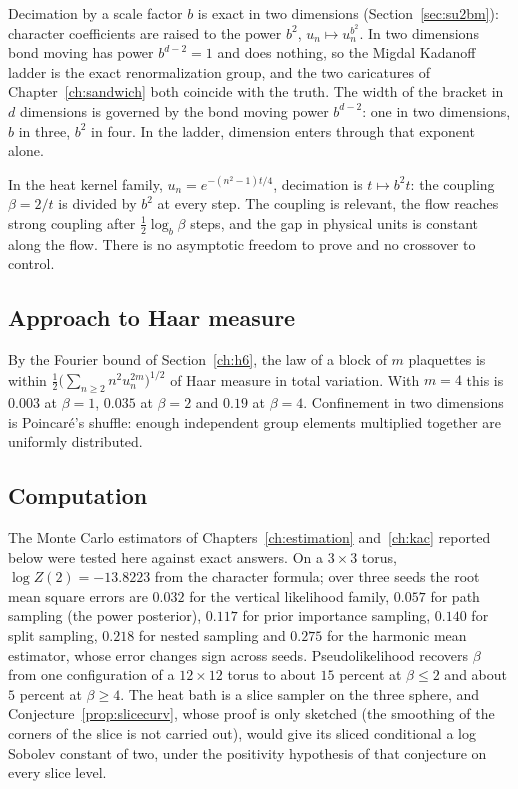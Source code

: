 Decimation by a scale factor $b$ is exact in two dimensions (Section~\ref{sec:su2bm}): character coefficients are raised to the power $b^2$, $u_n\mapsto u_n^{b^2}$. In two dimensions bond moving has power $b^{d-2}=1$ and does nothing, so the Migdal Kadanoff ladder is the exact renormalization group, and the two caricatures of Chapter~\ref{ch:sandwich} both coincide with the truth. The width of the bracket in $d$ dimensions is governed by the bond moving power $b^{d-2}$: one in two dimensions, $b$ in three, $b^2$ in four. In the ladder, dimension enters through that exponent alone.

In the heat kernel family, $u_n=e^{-(n^2-1)t/4}$, decimation is $t\mapsto b^2t$: the coupling $\beta=2/t$ is divided by $b^2$ at every step. The coupling is relevant, the flow reaches strong coupling after $\frac12\log_b\beta$ steps, and the gap in physical units is constant along the flow. There is no asymptotic freedom to prove and no crossover to control.

\subsection{Approach to Haar measure}

By the Fourier bound of Section~\ref{ch:h6}, the law of a block of $m$ plaquettes is within $\frac12\big(\sum_{n\ge2}n^2u_n^{2m}\big)^{1/2}$ of Haar measure in total variation. With $m=4$ this is $0.003$ at $\beta=1$, $0.035$ at $\beta=2$ and $0.19$ at $\beta=4$. Confinement in two dimensions is Poincar\'e's shuffle: enough independent group elements multiplied together are uniformly distributed.

\subsection{Computation}

The Monte Carlo estimators of Chapters~\ref{ch:estimation} and~\ref{ch:kac} reported below were tested here against exact answers. On a $3\times3$ torus, $\log Z(2)=-13.8223$ from the character formula; over three seeds the root mean square errors are $0.032$ for the vertical likelihood family, $0.057$ for path sampling (the power posterior), $0.117$ for prior importance sampling, $0.140$ for split sampling, $0.218$ for nested sampling and $0.275$ for the harmonic mean estimator, whose error changes sign across seeds. Pseudolikelihood recovers $\beta$ from one configuration of a $12\times12$ torus to about $15$ percent at $\beta\le2$ and about $5$ percent at $\beta\ge4$. The heat bath is a slice sampler on the three sphere, and Conjecture~\ref{prop:slicecurv}, whose proof is only sketched (the smoothing of the corners of the slice is not carried out), would give its sliced conditional a log Sobolev constant of two, under the positivity hypothesis of that conjecture on every slice level.

